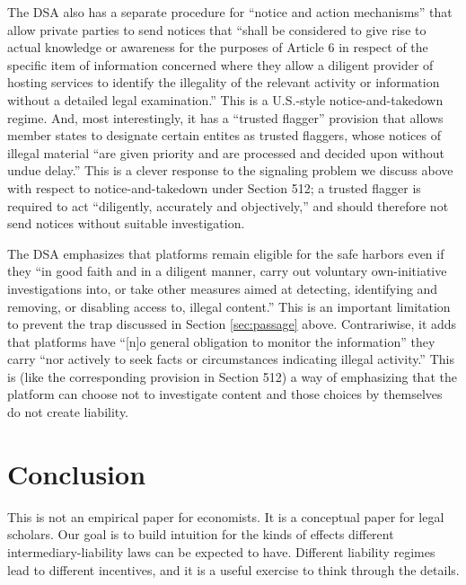 The DSA also has a separate procedure for ``notice and action mechanisms'' that allow private parties to send notices that ``shall be considered to give rise to actual knowledge or awareness for the purposes of Article 6 in respect of the specific item of information concerned where they allow a diligent provider of hosting services to identify the illegality of the relevant activity or information without a detailed legal examination.'' This is a  U.S.-style notice-and-takedown regime. And, most interestingly, it has a ``trusted flagger'' provision that allows member states to designate certain entites as trusted flaggers, whose notices of illegal material ``are given priority and are processed and decided upon without undue delay.'' This is a clever response to the signaling problem we discuss above with respect to notice-and-takedown under Section 512; a trusted flagger is required to act ``diligently, accurately and objectively,'' and should therefore not send notices without suitable investigation.

The DSA emphasizes that platforms remain eligible for the safe harbors even if they ``in good faith and in a diligent manner, carry out voluntary own-initiative investigations into, or take other measures aimed at detecting, identifying and removing, or disabling access to, illegal content.'' This is an important limitation to prevent the  trap discussed in Section \ref{sec:passage} above. Contrariwise, it adds that platforms have ``[n]o general obligation to monitor the information'' they carry ``nor actively to seek facts or circumstances indicating illegal activity.'' This is (like the corresponding provision in Section 512) a way of emphasizing that the platform can choose not to investigate content and those choices by themselves do not create liability.

\section{Conclusion}

This is not an empirical paper for economists. It is a conceptual paper for legal scholars. Our goal is to build intuition for the kinds of effects different intermediary-liability laws can be expected to have. Different liability regimes lead to different incentives, and it is a useful exercise to think through the details.
